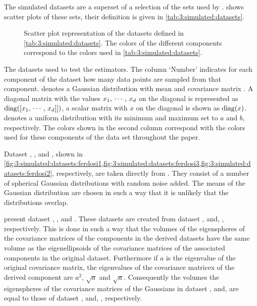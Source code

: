 
The simulated datasets are a superset of a selection of the sets used by \textcite{ferdosi2011comparison}.  shows scatter plots of these sets, their definition is given in \cref{tab:3:simulated:datasets}.

\begin{figure*}
	\centering
	
	\caption{Scatter plot representation of the datasets defined in \cref{tab:3:simulated:datasets}. The colors of the different components correspond to the colors used in \cref{tab:3:simulated:datasets}.}
	\label{fig:3:simulated:datasets}
\end{figure*}

\begin{table*}[!htbp]
	\centering
	
	\caption{The datasets used to test the estimators. The column `Number' indicates for each component of the dataset how many data points are sampled from that component. \gaussDist{\varMean}{\varCovarianceMatrix} denotes a Gaussian distribution with mean \varMean and covariance matrix \varCovarianceMatrix. A diagonal matrix with the values $x_1,\, \cdots,\, x_d$ on the diagonal is represented as $\operatorname{diag}([x_1,\,\cdots,\,x_d]])$, a scalar matrix with $x$ on the diagonal is shown as $\operatorname{diag}(x)$.  denotes a uniform distribution with its minimum and maximum set to $a$ and $b$, respectively. The colors shown in the second column correspond with the colors used for these components of the data set throughout the paper.} 	
	\label{tab:3:simulated:datasets}
\end{table*}

Dataset \ferdosiOne, \ferdosiTwo, and \ferdosiThree, shown in \cref{fig:3:simulated:datasets:ferdosi1,fig:3:simulated:datasets:ferdosi3,fig:3:simulated:datasets:ferdosi2}, respectively, are taken directly from \citeauthor{ferdosi2011comparison}. They consist of a number of spherical Gaussian distributions with random noise added. The means of the Gaussian distribution are chosen in such a way that it is unlikely that the distributions overlap.

 present dataset \baakmanOne, \baakmanTwo, and \baakmanThree. These datasets are created from dataset \ferdosiOne, \ferdosiTwo and, \ferdosiThree, respectively. This is done in such a way that the volumes of the eigenspheres of the covariance matrices of the components in the derived datasets have the same volume as the eigenellipsoids of the covariance matrices of the associated components in the original dataset. Furthermore if $a$ is the eigenvalue of the original covariance matrix, the eigenvalues of the covariance matricex of the derived component are $a^2$, $\sqrt{a}$ and $\sqrt{a}$. Consequently the volumes the eigenspheres of the covariance matrices of the Gaussians in dataset \baakmanOne, \baakmanTwo and, \baakmanThree are equal to those of dataset \ferdosiOne, \ferdosiTwo and, \ferdosiThree, respectively.

